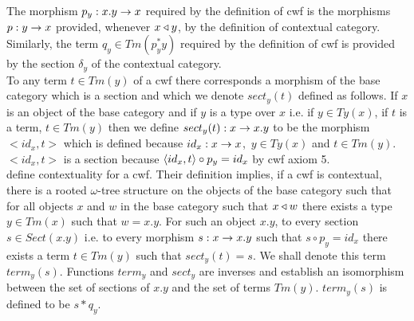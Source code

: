The morphism $p_y: x.y \rightarrow x$ required by the definition of cwf is the morphisms $p: y \rightarrow x$ provided, whenever $x \triangleleft y$, by the definition of contextual category.
Similarly, the term $q_y \in Tm(p_y ^* y)$ required by the definition of cwf is provided by the 
section $\delta_y$ of the contextual category. \\

\note To any term $t \in Tm(y)$  of a cwf \catcw there corresponds a morphism of the base category which is a section
and which we denote $sect_y(t)$  defined as follows. 
If $x$ is an object of the base category and if 
$y$ is a type over $x$ i.e. if $y \in Ty(x)$, if $t$ is a term, $t \in Tm(y)$ 
then we define $sect_y(t): x \rightarrow x.y$
to be the morphism $<id_x,t>$ which is defined because $id_x : x \rightarrow x$,\ $y \in Ty(x)$ 
and $t \in Tm(y)$.
$<id_x,t>$ is a section because $\langle id_x,t\rangle \circ p_y=id_x$ by cwf axiom 5. \\

\note 
\cite{CastellanClairambaultDybjer2019} define contextuality for a cwf.
Their definition implies, if a cwf is contextual,  there is a rooted $\omega$-tree structure on the objects of the base category 
such that for all objects $x$ and $w$ in the base category such that $x \triangleleft w$ there exists
a type $y \in Tm(x)$ such that $w=x.y$.
For such an object $x.y$, to every section $s \in Sect(x.y)$ i.e. to
every morphism $s: x \rightarrow x.y$ such that $s \circ p_y=id_x$ there exists a term $t \in Tm(y)$ such that $sect_y(t)=s$.
We shall denote this term $term_y(s)$. Functions $term_y$ and $sect_y$ are inverses and establish an isomorphism between
the set of sections of $x.y$ and the set of terms $Tm(y)$. $term_y(s)$ is defined to be $s*q_y$. \\

